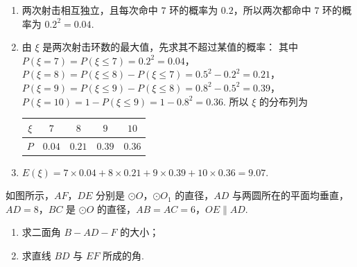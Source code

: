 \begin{solution}
\begin{enumerate}
\item 两次射击相互独立，且每次命中 \(7\) 环的概率为 \(0.2\)，所以两次都命中 \(7\) 环的概率为 \(0.2^2=0.04\).

\item 由 \(\xi\) 是两次射击环数的最大值，先求其不超过某值的概率：
其中 \(P(\xi=7)=P(\xi\leqslant7)=0.2^2=0.04\)，\(P(\xi=8)=P(\xi\leqslant8)-P(\xi\leqslant7)=0.5^2-0.2^2=0.21\)，\(P(\xi=9)=P(\xi\leqslant9)-P(\xi\leqslant8)=0.8^2-0.5^2=0.39\)，\(P(\xi=10)=1-P(\xi\leqslant9)=1-0.8^2=0.36\).
所以 \(\xi\) 的分布列为
\begin{center}
\begin{tabular}{c|cccc}
\(\xi\)&\(7\)&\(8\)&\(9\)&\(10\)\\ \hline
\(P\)&\(0.04\)&\(0.21\)&\(0.39\)&\(0.36\)
\end{tabular}
\end{center}

\item
\(E(\xi)=7\times0.04+8\times0.21+9\times0.39+10\times0.36=9.07\).
\end{enumerate}
\end{solution}

\begin{problem}
如图所示，\(AF\)，\(DE\) 分别是 \(\odot O\)，\(\odot O_1\) 的直径，\(AD\) 与两圆所在的平面均垂直，\(AD = 8\)，\(BC\) 是 \(\odot O\) 的直径，\(AB = AC = 6\)，\(OE \parallel AD\).

\begin{enumerate}
\item 求二面角 \(B-AD-F\) 的大小；
\item 求直线 \(BD\) 与 \(EF\) 所成的角.
\end{enumerate}

\end{problem}

